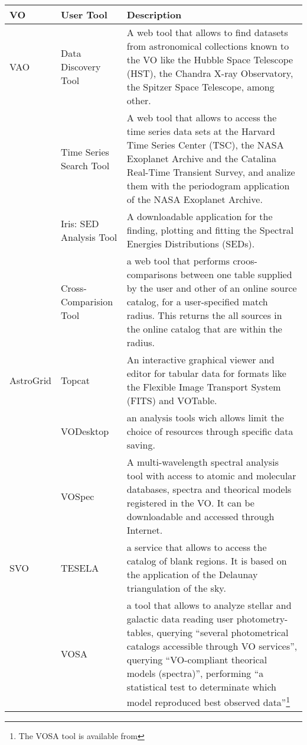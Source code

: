 \begin{table*}[h!t]
	\centering
	\begin{tabular}{|l|l|p{12.5cm}|}
	\hline
	\textbf{VO} & \textbf{User Tool} & \textbf{Description}\\
	\hline
	VAO	& Data Discovery Tool & A web tool that allows to find datasets from astronomical collections known to the VO like the Hubble Space Telescope 
									(HST), the Chandra X-ray Observatory, the Spitzer Space Telescope, among other.\\
			& Time Series Search Tool & A web tool that allows to access the time series data sets at the Harvard Time Series Center (TSC), the NASA 
									Exoplanet Archive and the Catalina Real-Time Transient Survey, and analize them with the periodogram application 
									of the NASA Exoplanet Archive.\\
			& Iris: SED Analysis Tool & A downloadable application for the finding, plotting and fitting the 
			Spectral Energies Distributions (SEDs). \\
	    	& Cross-Comparision Tool & a web tool that performs croos-comparisons between one table supplied by the user and other of an online source 
								catalog, for a user-specified match radius. This returns the all sources in the online catalog that are within the radius.\\
	\hline
AstroGrid & Topcat & An interactive graphical viewer and editor for tabular data for formats like the Flexible Image Transport System (FITS) 
									and VOTable. \\
			& VODesktop & an analysis tools wich allows limit the choice of resources through specific data saving.\\
	\hline		
			& VOSpec & A multi-wavelength spectral analysis tool with access to atomic and molecular databases, spectra and theorical models registered 
									in the VO. It can be downloadable and accessed through Internet.\\
	\hline								
	SVO		& TESELA & a service that allows to access the catalog of blank regions. It is based on the application of the Delaunay triangulation
									 of the sky. \\
		   	& VOSA & a tool that allows to analyze stellar and galactic data reading user photometry-tables, querying ``several photometrical 
								catalogs accessible through VO services'', querying ``VO-compliant theorical models (spectra)'', performing ``a 
								statistical test to determinate which model reproduced best observed data''\footnote{The VOSA tool is available from 
}
\end{tabular}
\end{table*}
